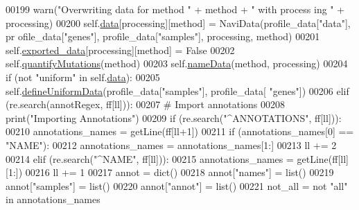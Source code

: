 \begin{DoxyCode}
00199                     warn(\textcolor{stringliteral}{"Overwriting data for method "} + method + \textcolor{stringliteral}{" with process
      ing "} + processing)
00200                 self.\hyperlink{classnavicom_1_1navicom_1_1NaviCom_aa1abff245573ed8406c6bddb4596f093}{data}[processing][method] = NaviData(profile\_data[\textcolor{stringliteral}{"data"}], pr
      ofile\_data[\textcolor{stringliteral}{"genes"}], profile\_data[\textcolor{stringliteral}{"samples"}], processing, method)
00201                 self.\hyperlink{classnavicom_1_1navicom_1_1NaviCom_a5995e07de24daa015b8b44b1ae0cada7}{exported_data}[processing][method] = \textcolor{keyword}{False}
00202                 self.\hyperlink{classnavicom_1_1navicom_1_1NaviCom_a5314c49d6b9749693519a4a86cbfde71}{quantifyMutations}(method)
00203                 self.\hyperlink{classnavicom_1_1navicom_1_1NaviCom_a8e735eed992a5cf92616113d47eea6ee}{nameData}(method, processing)
00204                 \textcolor{keywordflow}{if} (\textcolor{keywordflow}{not} \textcolor{stringliteral}{"uniform"} \textcolor{keywordflow}{in} self.\hyperlink{classnavicom_1_1navicom_1_1NaviCom_aa1abff245573ed8406c6bddb4596f093}{data}):
00205                     self.\hyperlink{classnavicom_1_1navicom_1_1NaviCom_a628c6252226b65dca80237d6783c08c6}{defineUniformData}(profile\_data[\textcolor{stringliteral}{"samples"}], profile\_data[
      \textcolor{stringliteral}{"genes"}])
00206             \textcolor{keywordflow}{elif} (re.search(annotRegex, ff[ll])):
00207                 \textcolor{comment}{# Import annotations}
00208                 \textcolor{keywordflow}{print}(\textcolor{stringliteral}{"Importing Annotations"})
00209                 \textcolor{keywordflow}{if} (re.search(\textcolor{stringliteral}{"^ANNOTATIONS"}, ff[ll])):
00210                     annotations\_names = getLine(ff[ll+1])
00211                     \textcolor{keywordflow}{if} (annotations\_names[0] == \textcolor{stringliteral}{"NAME"}):
00212                         annotations\_names = annotations\_names[1:]
00213                     ll += 2
00214                 \textcolor{keywordflow}{elif} (re.search(\textcolor{stringliteral}{"^NAME"}, ff[ll])):
00215                     annotations\_names = getLine(ff[ll][1:])
00216                     ll += 1
00217                 annot = dict()
00218                 annot[\textcolor{stringliteral}{"names"}] = list()
00219                 annot[\textcolor{stringliteral}{"samples"}] = list()
00220                 annot[\textcolor{stringliteral}{"annot"}] = list()
00221                 not\_all = \textcolor{keywordflow}{not} \textcolor{stringliteral}{"all"} \textcolor{keywordflow}{in} annotations\_names

\end{DoxyCode}
